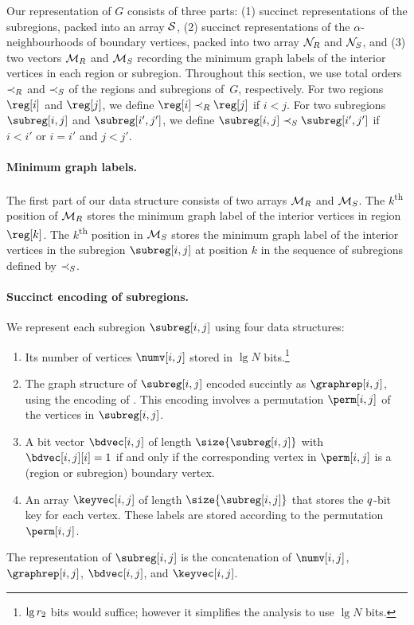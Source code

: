 Our representation of $G$ consists of three parts: (1) succinct
representations of the subregions, packed into an array $\mathcal{S}$, (2)
succinct representations of the $\alpha$-neighbourhoods of boundary
vertices, packed into two array $\mathcal{N}_R$ and $\mathcal{N}_S$, and (3) two
vectors $\mathcal{M}_R$ and $\mathcal{M}_S$ recording the minimum graph labels of
the interior vertices in each region or subregion.
Throughout this section, we use total orders $\prec_R$ and $\prec_S$ of the
regions and subregions of~$G$, respectively.
For two regions $\reg[i]$ and $\reg[j]$, we define $\reg[i] \reglt \reg[j]$ if
$i < j$.
For two subregions $\subreg[i,j]$ and $\subreg[i',j']$, we define
$\subreg[i,j] \subreglt \subreg[i',j']$ if $i < i'$ or $i = i'$ and $j < j'$.

\paragraph{Minimum graph labels.}

The first part of our data structure consists of two arrays $\mathcal{M}_R$ and
$\mathcal{M}_S$.
The $k$\textsuperscript{th} position of $\mathcal{M}_R$ stores the minimum graph
label of the interior vertices in region $\reg[k]$.
The $k$\textsuperscript{th} position in $\mathcal{M}_S$ stores the minimum graph label of the
interior vertices in the subregion $\subreg[i,j]$ at position $k$ in the
sequence of subregions defined by $\prec_S$.

\paragraph{Succinct encoding of subregions.}

We represent each subregion $\subreg[i,j]$ using four data structures:
\begin{enumerate}
\item Its number of vertices $\numv[i,j]$ stored in $\lg N$
  bits.\footnote{$\lg r_2$ bits would suffice; however it simplifies the
    analysis to use $\lg N$ bits.}
\item The graph structure of $\subreg[i,j]$ encoded succintly as
	$\graphrep[i,j]$, using the encoding of 
	\cite{DBLP:journals/siamcomp/ChiangLL05}.
  This encoding involves a permutation $\perm[i,j]$ of
  the vertices in $\subreg[i,j]$.
\item A bit vector $\bdvec[i,j]$ of length $\size{\subreg[i,j]}$ with
  $\bdvec[i,j][i] = 1$ if and only if the corresponding vertex in $\perm[i,j]$
  is a  (region or subregion) boundary vertex.
\item An array $\keyvec[i,j]$ of length $\size{\subreg[i,j]}$ that stores the
  $q$-bit key for each vertex.
  These labels are stored according to the permutation $\perm[i,j]$.
\end{enumerate}
The representation of $\subreg[i,j]$ is the concatenation of $\numv[i,j]$,
$\graphrep[i,j]$, $\bdvec[i,j]$, and $\keyvec[i,j]$.

